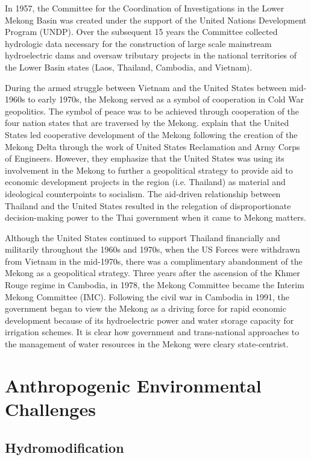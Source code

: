   In 1957, the Committee for the Coordination of Investigations in the Lower Mekong Basin was created under the support of the United Nations Development Program (UNDP). Over the subsequent 15 years the Committee collected hydrologic data necessary for the construction of large scale mainstream hydroelectric dams and oversaw tributary projects in the national territories of the Lower Basin states (Laos, Thailand, Cambodia, and Vietnam).
  
  During the armed struggle between Vietnam and the United States between mid-1960s to early 1970s, the Mekong served as a symbol of cooperation in Cold War geopolitics. The symbol of peace was to be achieved through cooperation of the four nation states that are traversed by the Mekong. \citet{sneddon2006rethinking}  explain that the United States led cooperative development of the Mekong following the creation of the Mekong Delta through the work of United States Reclamation and Army Corps of Engineers. However, they emphasize that the United States was using its involvement in the Mekong to further a geopolitical strategy to provide aid to economic development projects in the region (i.e. Thailand) as material and ideological counterpoints to socialism. The aid-driven relationship between Thailand and the United States resulted in the relegation of disproportionate decision-making power to the Thai government when it came to Mekong matters.
  
  
Although the United States continued to support Thailand financially and militarily throughout the 1960s and 1970s, when the US Forces were withdrawn from Vietnam in the mid-1970s, there was a complimentary abandonment of the Mekong as a geopolitical strategy. Three years after the ascension of the Khmer Rouge regime in Cambodia, in 1978, the Mekong Committee became the Interim Mekong Committee (IMC). Following the civil war in Cambodia in 1991, the government began to view the Mekong as a driving force for rapid economic development because of its hydroelectric power and water storage capacity for irrigation schemes. It is clear how government and trans-national approaches to the management of water resources in the Mekong were cleary state-centrist. 

\section{Anthropogenic Environmental Challenges}

\subsection{Hydromodification}

